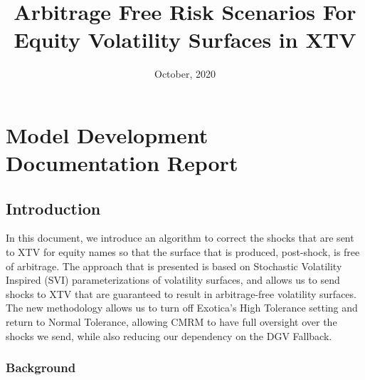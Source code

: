 \documentclass[11pt,letterpaper]{article}
\begin{document}
\date{October, 2020}
\title{Arbitrage Free Risk Scenarios For Equity Volatility Surfaces in XTV}
\submission{}
\maketitlepage
{}
\section{Model Development Documentation Report}
\subsection{Introduction}

In this document, we introduce an algorithm to correct the shocks that are sent to XTV for equity names so that the surface that is produced, post-shock, is free of arbitrage. The approach that is presented is based on Stochastic Volatility Inspired (SVI) parameterizations of volatility surfaces, and allows us to send shocks to XTV that are  guaranteed to result in arbitrage-free volatility surfaces. The new methodology allows us to turn off Exotica's High Tolerance setting and return to Normal Tolerance, allowing CMRM to have full oversight over the shocks we send, while also reducing our dependency on the DGV Fallback. 



\subsubsection{Background}
\end{document}
